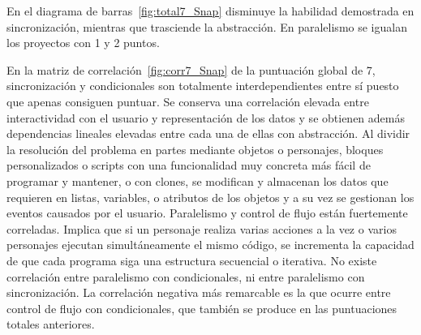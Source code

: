 \documentclass[a4paper, 12pt]{book}
\begin{document}
En el diagrama de barras~\ref{fig:total7_Snap} disminuye la habilidad demostrada en sincronización, mientras que trasciende la abstracción. En paralelismo se igualan los proyectos con 1 y 2 puntos.

En la matriz de correlación~\ref{fig:corr7_Snap} de la puntuación global de 7, sincronización y condicionales son totalmente interdependientes entre sí puesto que apenas consiguen puntuar. Se conserva una correlación elevada entre interactividad con el usuario y representación de los datos y se obtienen además dependencias lineales elevadas entre cada una de ellas con abstracción. Al dividir la resolución del problema en partes mediante objetos o personajes, bloques personalizados o scripts con una funcionalidad muy concreta más fácil de programar y mantener, o con clones, se modifican y almacenan los datos que requieren en listas, variables, o atributos de los objetos y a su vez se gestionan los eventos causados por el usuario. Paralelismo y control de flujo están fuertemente correladas. Implica que si un personaje realiza varias acciones a la vez o varios personajes ejecutan simultáneamente el mismo código, se incrementa la capacidad de que cada programa siga una estructura secuencial o iterativa. No existe correlación entre paralelismo con condicionales, ni entre paralelismo con sincronización. La correlación negativa más remarcable es la que ocurre entre control de flujo con condicionales, que también se produce en las puntuaciones totales anteriores.
\end{document}
